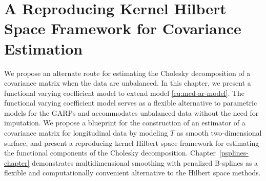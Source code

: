 

\chapter{A Reproducing Kernel Hilbert Space Framework for Covariance Estimation} \label{SSANOVA-chapter}


We propose an alternate route for estimating the Cholesky decomposition of a covariance matrix when the data are unbalanced. In this chapter, we present a functional varying coefficient model to extend model \eqref{eq:mcd-ar-model}. The functional varying coefficient model serves as a flexible alternative to parametric models for the GARPs and accommodates unbalanced data without the need for imputation. We propose a blueprint for the construction of an estimator of a covariance matrix for longitudinal data by modeling $T$ as smooth two-dimensional surface, and present a reproducing kernel Hilbert space framework for estimating the functional components of the Cholesky decomposition. Chapter~\ref{psplines-chapter} demonstrates multidimensional smoothing with penalized B-splines as a flexible and computationally convenient alternative to the Hilbert space methods.

\bigskip
%
%
%

